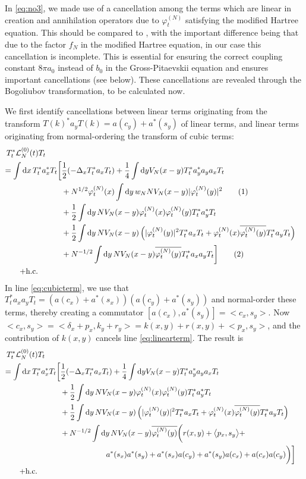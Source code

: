 \documentclass[11pt,a4paper,DIV11]{scrartcl}	%
\newcommand{\di}{\textrm{d}}		%
\newcommand{\Lcal}{\mathcal{L}}		%
\newcommand{\hc}{\mbox{h.c.}}		%
\newcommand{\scal}[2]{\big<#1,#2\big>} %
\newcommand{\cc}[1]{\overline{#1}}	%
\newcommand{\ph}{\varphi_t^{(N)}}	%
\newcommand{\bd}{\begin{displaymath}}			%
\newcommand{\ed}{\end{displaymath}}
\newcommand{\tagg}[1]{ \stepcounter{equation} \tag{\theequation} \label{eq:#1} } %
\newcommand{\eqr}[1]{\eqref{eq:#1}}			%
\begin{document}
In \eqr{no3}, we made use of a cancellation among the terms which are linear in creation and annihilation operators due to $\ph$ satisfying the modified Hartree equation.
This should be compared to \cite{RS2009}, with the important difference being that due to the factor $f_N$ in the modified Hartree equation, in our case this cancellation is incomplete. This is essential for ensuring the correct coupling constant $8\pi a_0$ instead of $b_0$ in the Gross-Pitaevskii equation and ensures important cancellations (see below). These cancellations are revealed through the Bogoliubov transformation, to be calculated now.

We first identify cancellations between linear terms originating from the
transform \linebreak $T(k)^* a_y T(k) = a(c_y) + a^*(s_y)$ of linear terms,
and linear terms originating from normal-ordering the transform of cubic
terms:
\begin{align*}
T^*_t \Lcal^{(0)}_N(t) T_t \qquad \\
= \int \di x\, T^*_t a^*_x T_t \bigg[ &   \frac{1}{2}(-\Delta_x T^*_t a_x T_t)  + \frac{1}{4}\int \di y V_N(x-y) T^*_t a^*_y a_y a_x T_t \\
& + N^{1/2} \ph(x) \int \di y\, w_N N V_N(x-y) \lvert \ph(y) \rvert^2 \tagg{linearterm} \\
& + \frac{1}{2} \int \di y\, NV_N(x-y)  \ph(x) \ph(y)  T^*_t a^*_y T_t \\
& + \frac{1}{2} \int \di y\, NV_N(x-y) \left(  \lvert \ph(y)\rvert^2 T^*_t a_x T_t + \ph(x) \cc{\ph(y)} T^*_t a_y T_t  \right) \\
& + N^{-1/2} \int \di y\, NV_N(x-y) \cc{\ph(y)} T^*_t a_x a_y T_t  \bigg]\tagg{cubicterm} \\
+ \hc \qquad \quad
\end{align*}
In line \eqr{cubicterm}, we use that $T^\ast_t a_x a_y T_t = \left( a(c_x)+a^\ast
(s_x) \right)\left( a(c_y) + a^\ast(s_y) \right)$ and normal-order these
terms, thereby creating a commutator $[a(c_x),a^\ast(s_y)] = \scal{c_x}{s_y}$. Now $\scal{c_x}{s_y} = \scal{\delta_x + p_x}{k_y + r_y} = k(x,y) + r(x,y) + \scal{p_x}{s_y}$, and the contribution of $k(x,y)$ cancels line \eqr{linearterm}. The result is
\begin{align*}
T^*_t \Lcal^{(0)}_N(t) T_t \qquad \\
= \int \di x\, T^*_t a^*_x T_t \bigg[ &   \frac{1}{2}(-\Delta_x T^*_t a_x T_t)  + \frac{1}{4}\int \di y V_N(x-y) T^*_t a^*_y a_y a_x T_t \\
& + \frac{1}{2} \int \di y\, NV_N(x-y)  \ph(x) \ph(y)  T^*_t a^*_y T_t \\
& + \frac{1}{2} \int \di y\, NV_N(x-y) \left(  \lvert \ph(y)\rvert^2 T^*_t a_x T_t + \ph(x) \cc{\ph(y)} T^*_t a_y T_t  \right) \\
& + N^{-1/2} \int \di y\, NV_N(x-y) \cc{\ph(y)} \bigg( r(x,y) + \scal{p_x}{s_y} + \\
& \qquad \qquad \hspace{0.7cm}   a^*(s_x) a^*(s_y) + a^*(s_x) a(c_y)  + a^*(s_y) a(c_x) + a(c_x) a(c_y)  \bigg)  \bigg] \\
+ \hc \qquad \quad
\end{align*}
\end{document}
